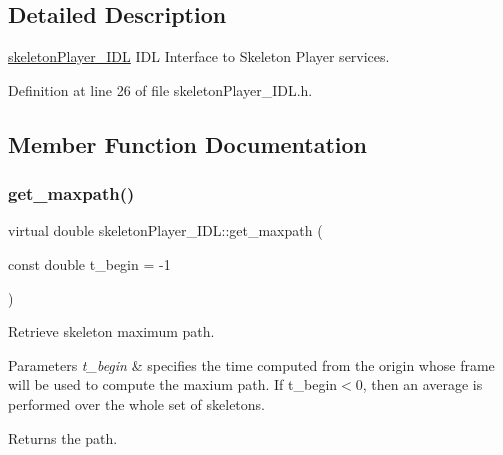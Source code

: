 \subsection{Detailed Description}
\mbox{\hyperlink{classskeletonPlayer__IDL}{skeleton\+Player\+\_\+\+I\+DL}} I\+DL Interface to Skeleton Player services. 

Definition at line 26 of file skeleton\+Player\+\_\+\+I\+D\+L.\+h.



\subsection{Member Function Documentation}
\mbox{\label{classskeletonPlayer__IDL_adf73eb4c86d9d8a19149b29db4284538}} 
\subsubsection{\texorpdfstring{get\_maxpath()}{get\_maxpath()}}
{\footnotesize\ttfamily virtual double skeleton\+Player\+\_\+\+I\+D\+L\+::get\+\_\+maxpath (\begin{DoxyParamCaption}\item[{const double}]{t\+\_\+begin = {\ttfamily -\/1} }\end{DoxyParamCaption})\hspace{0.3cm}{\ttfamily [virtual]}}


\begin{DoxyItemize}
\item Retrieve skeleton maximum path.
\item 
\begin{DoxyParams}{Parameters}
{\em t\+\_\+begin} & specifies the time computed from the origin whose frame will be used to compute the maxium path. If t\+\_\+begin$<$0, then an average is performed over the whole set of skeletons.\\
\hline
\end{DoxyParams}

\item \begin{DoxyReturn}{Returns}
the path. 
\end{DoxyReturn}

\end{DoxyItemize}\mbox{\label{classskeletonPlayer__IDL_abd0b1247e03f88d2169b0ed943ef91b7}} 
